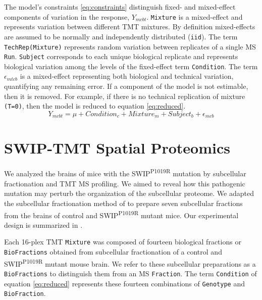 \documentclass[11pt]{elife}\usepackage[]{graphicx}\usepackage[]{color}
\begin{document}
The model's constraints \ref{eq:constraints} distinguish fixed- and mixed-effect
components of variation in the response, $Y_{mcbt}$. \texttt{Mixture} is a
mixed-effect and represents variation between different TMT mixtures. By
definition mixed-effects are assumed to be normally and independently
distributed (\texttt{iid}).  The term \texttt{TechRep(Mixture)} represents
random variation between replicates of a single MS \texttt{Run}.
\texttt{Subject} corresponds to each unique biological replicate and represents
biological variation among the levels of the fixed-effect term \texttt{Condition}.
The term $\epsilon_{mtcb}$ is a mixed-effect representing both biological and
technical variation, quantifying any remaining error. If a component of the
model is not estimable, then it is removed.  For example, if there is no
technical replication of mixture \texttt{(T=0)}, then the model is reduced to
equation \ref{eq:reduced}.
\begin{equation} %
	\label{eq:reduced} %
	Y_{mcbt} = \mu + Condition_c + Mixture_m + Subject_b + \epsilon_{mcb}
\end{equation}


\section{SWIP-TMT Spatial Proteomics}

We analyzed the brains of mice with the SWIP\textsuperscript{P1019R} mutation by
subcellular fractionation and TMT MS profiling.  We aimed to reveal how this
pathogenic mutation may perturb the organization of the subcellular proteome.
We adapted the subcellular fractionation method of \cite{Geladaki2019} to
prepare seven subcellular fractions from the brains of control and
SWIP\textsuperscript{P1019R} mutant mice.  Our experimental design is summarized
in .  

Each 16-plex TMT \texttt{Mixture} was composed of fourteen
biological fractions or \texttt{BioFractions} obtained from subcellular
fractionation of a control and SWIP\textsuperscript{P1019R} mutant mouse brain.
We refer to these subcellular preparations as a \texttt{BioFractions} to
distinguish them from an MS \texttt{Fraction}.  The term \texttt{Condition} of
equation \ref{eq:reduced} represents these fourteen combinations of
\texttt{Genotype} and \texttt{BioFraction}.  
\end{document}
